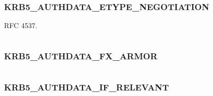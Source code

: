 \documentclass[letterpaper,10pt,english]{sphinxmanual}
\begin{document}
\subsubsection{KRB5\_AUTHDATA\_ETYPE\_NEGOTIATION}
\label{appdev/refs/macros/KRB5_AUTHDATA_ETYPE_NEGOTIATION:krb5-authdata-etype-negotiation}\label{appdev/refs/macros/KRB5_AUTHDATA_ETYPE_NEGOTIATION::doc}\label{appdev/refs/macros/KRB5_AUTHDATA_ETYPE_NEGOTIATION:krb5-authdata-etype-negotiation-data}

\begin{fulllineitems}
\label{appdev/refs/macros/KRB5_AUTHDATA_ETYPE_NEGOTIATION:KRB5_AUTHDATA_ETYPE_NEGOTIATION}
\end{fulllineitems}


RFC 4537.

\begin{tabulary}{\linewidth}{|L|L|}
\hline

 & 
\\
\hline\end{tabulary}



\subsubsection{KRB5\_AUTHDATA\_FX\_ARMOR}
\label{appdev/refs/macros/KRB5_AUTHDATA_FX_ARMOR::doc}\label{appdev/refs/macros/KRB5_AUTHDATA_FX_ARMOR:krb5-authdata-fx-armor}\label{appdev/refs/macros/KRB5_AUTHDATA_FX_ARMOR:krb5-authdata-fx-armor-data}

\begin{fulllineitems}
\label{appdev/refs/macros/KRB5_AUTHDATA_FX_ARMOR:KRB5_AUTHDATA_FX_ARMOR}
\end{fulllineitems}


\begin{tabulary}{\linewidth}{|L|L|}
\hline

 & 
\\
\hline\end{tabulary}



\subsubsection{KRB5\_AUTHDATA\_IF\_RELEVANT}
\label{appdev/refs/macros/KRB5_AUTHDATA_IF_RELEVANT:krb5-authdata-if-relevant-data}\label{appdev/refs/macros/KRB5_AUTHDATA_IF_RELEVANT:krb5-authdata-if-relevant}\label{appdev/refs/macros/KRB5_AUTHDATA_IF_RELEVANT::doc}
\end{document}
